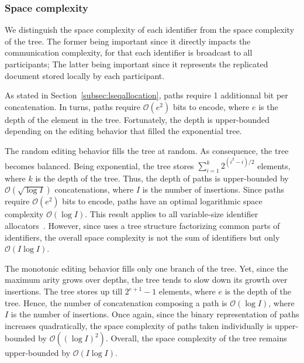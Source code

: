 
\subsubsection{Space complexity}

We distinguish the space complexity of each identifier from the space complexity
of the tree. The former being important since it directly impacts the
communication complexity, for that each identifier is broadcast to all
participants; The latter being important since it represents the replicated
document stored locally by each participant.

As stated in Section~\ref{subsec:lseqallocation}, paths require 1 additionnal
bit per concatenation. In turns, paths require $\mathcal{O}(e^2)$ bits to
encode, where $e$ is the depth of the element in the tree. Fortunately, the
depth is upper-bounded depending on the editing behavior that filled the
exponential tree.

The random editing behavior fills the tree at random. As consequence, the tree
becomes balanced. Being exponential, the tree stores
$\textstyle\sum\nolimits_{i=1}^{k}{2^{(i^2-i)/2}}$ elements, where $k$ is the
depth of the tree. Thus, the depth of paths is upper-bounded by
$\mathcal{O}(\sqrt{\log I})$ concatenations, where $I$ is the number of
insertions. Since paths require $\mathcal{O}(e^2)$ bits to encode, paths have an
optimal logarithmic space complexity $\mathcal{O}(\log I)$. This result applies
to all variable-size identifier allocators~\cite{preguica2009commutative,
  weiss2009logoot}. However, since \LSEQ uses a tree structure factorizing
common parts of identifiers, the overall space complexity is not the sum of
identifiers but only $\mathcal{O}(I\log I)$.

The monotonic editing behavior fills only one branch of the tree. Yet, since the
maximum arity grows over depths, the tree tends to slow down its growth over
insertions. The tree stores up till $2^{e+1}-1$ elements, where $e$ is the depth
of the tree. Hence, the number of concatenation composing a path is
$\mathcal{O}(\log I)$, where $I$ is the number of insertions. Once again, since
the binary representation of paths increases quadratically, the space complexity
of paths taken individually is upper-bounded by $\mathcal{O}((\log I)^2)$.
Overall, the space complexity of the tree remains upper-bounded by
$\mathcal{O}(I\log I)$.

